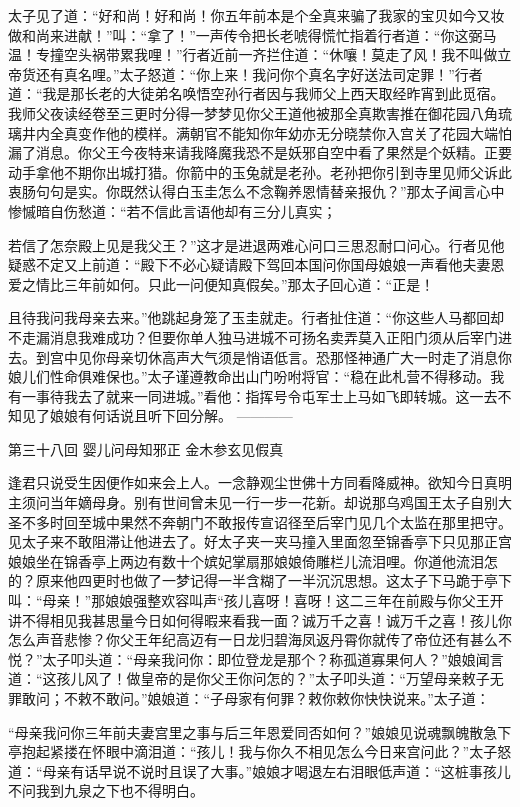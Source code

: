 \documentclass[12pt,UTF8]{ctexbook}
\begin{document}
太子见了道：“好和尚！好和尚！你五年前本是个全真来骗了我家的宝贝如今又妆做和尚来进献！”叫：“拿了！”一声传令把长老唬得慌忙指着行者道：“你这弼马温！专撞空头祸带累我哩！”行者近前一齐拦住道：“休嚷！莫走了风！我不叫做立帝货还有真名哩。”太子怒道：“你上来！我问你个真名字好送法司定罪！”行者道：“我是那长老的大徒弟名唤悟空孙行者因与我师父上西天取经昨宵到此觅宿。我师父夜读经卷至三更时分得一梦梦见你父王道他被那全真欺害推在御花园八角琉璃井内全真变作他的模样。满朝官不能知你年幼亦无分晓禁你入宫关了花园大端怕漏了消息。你父王今夜特来请我降魔我恐不是妖邪自空中看了果然是个妖精。正要动手拿他不期你出城打猎。你箭中的玉兔就是老孙。老孙把你引到寺里见师父诉此衷肠句句是实。你既然认得白玉圭怎么不念鞠养恩情替亲报仇？”那太子闻言心中惨慽暗自伤愁道：“若不信此言语他却有三分儿真实；

若信了怎奈殿上见是我父王？”这才是进退两难心问口三思忍耐口问心。行者见他疑惑不定又上前道：“殿下不必心疑请殿下驾回本国问你国母娘娘一声看他夫妻恩爱之情比三年前如何。只此一问便知真假矣。”那太子回心道：“正是！

且待我问我母亲去来。”他跳起身笼了玉圭就走。行者扯住道：“你这些人马都回却不走漏消息我难成功？但要你单人独马进城不可扬名卖弄莫入正阳门须从后宰门进去。到宫中见你母亲切休高声大气须是悄语低言。恐那怪神通广大一时走了消息你娘儿们性命俱难保也。”太子谨遵教命出山门吩咐将官：“稳在此札营不得移动。我有一事待我去了就来一同进城。”看他：指挥号令屯军士上马如飞即转城。这一去不知见了娘娘有何话说且听下回分解。
------------

第三十八回 婴儿问母知邪正 金木参玄见假真

逢君只说受生因便作如来会上人。一念静观尘世佛十方同看降威神。欲知今日真明主须问当年嫡母身。别有世间曾未见一行一步一花新。却说那乌鸡国王太子自别大圣不多时回至城中果然不奔朝门不敢报传宣诏径至后宰门见几个太监在那里把守。见太子来不敢阻滞让他进去了。好太子夹一夹马撞入里面忽至锦香亭下只见那正宫娘娘坐在锦香亭上两边有数十个嫔妃掌扇那娘娘倚雕栏儿流泪哩。你道他流泪怎的？原来他四更时也做了一梦记得一半含糊了一半沉沉思想。这太子下马跪于亭下叫：“母亲！”那娘娘强整欢容叫声“孩儿喜呀！喜呀！这二三年在前殿与你父王开讲不得相见我甚思量今日如何得暇来看我一面？诚万千之喜！诚万千之喜！孩儿你怎么声音悲惨？你父王年纪高迈有一日龙归碧海凤返丹霄你就传了帝位还有甚么不悦？”太子叩头道：“母亲我问你：即位登龙是那个？称孤道寡果何人？”娘娘闻言道：“这孩儿风了！做皇帝的是你父王你问怎的？”太子叩头道：“万望母亲敕子无罪敢问；不敕不敢问。”娘娘道：“子母家有何罪？敕你敕你快快说来。”太子道：

“母亲我问你三年前夫妻宫里之事与后三年恩爱同否如何？”娘娘见说魂飘魄散急下亭抱起紧搂在怀眼中滴泪道：“孩儿！我与你久不相见怎么今日来宫问此？”太子怒道：“母亲有话早说不说时且误了大事。”娘娘才喝退左右泪眼低声道：“这桩事孩儿不问我到九泉之下也不得明白。
\end{document}
